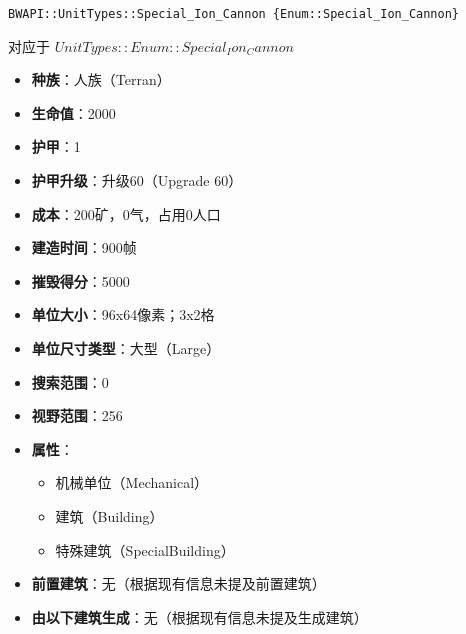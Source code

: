 \begin{tcolorbox}[colback=white, colframe=black!60!white, title=Special\_Ion\_Cannon(), arc=0mm]
    \begin{verbatim}
BWAPI::UnitTypes::Special_Ion_Cannon {Enum::Special_Ion_Cannon}
    \end{verbatim}
    对应于  $ UnitTypes::Enum::Special_Ion_Cannon $ 
    \begin{itemize}
        \item \textbf{种族}：人族（Terran）
        \item \textbf{生命值}：2000
        \item \textbf{护甲}：1
        \item \textbf{护甲升级}：升级60（Upgrade 60）
        \item \textbf{成本}：200矿，0气，占用0人口
        \item \textbf{建造时间}：900帧
        \item \textbf{摧毁得分}：5000
        \item \textbf{单位大小}：96x64像素；3x2格
        \item \textbf{单位尺寸类型}：大型（Large）
        \item \textbf{搜索范围}：0
        \item \textbf{视野范围}：256
        \item \textbf{属性}：
            \begin{itemize}
                \item 机械单位（Mechanical）
                \item 建筑（Building）
                \item 特殊建筑（SpecialBuilding）
            \end{itemize}
        \item \textbf{前置建筑}：无（根据现有信息未提及前置建筑）
        \item \textbf{由以下建筑生成}：无（根据现有信息未提及生成建筑）
    \end{itemize} 
\end{tcolorbox}

